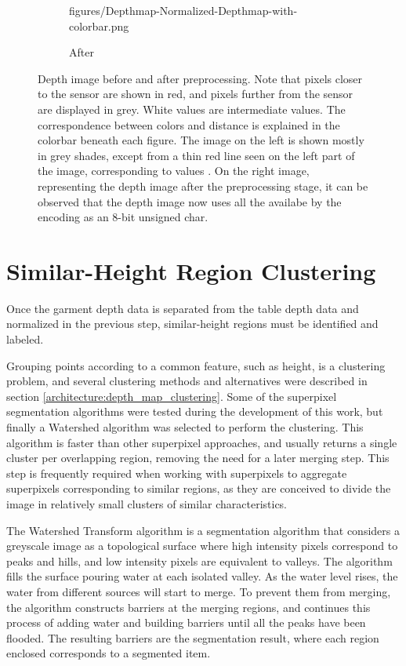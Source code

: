 \begin{figure}[htbp]
\begin{subfigure}[r]{0.485\textwidth}
    	{figures/Depthmap-Normalized-Depthmap-with-colorbar.png}
    	\caption{After}
    	\end{subfigure} 
    \caption[Depth image before and after preprocessing.]
    {Depth image before and after preprocessing. Note that pixels closer to the sensor are shown in red, and pixels further from the sensor are displayed in grey. White values are intermediate values. The correspondence between colors and distance is explained in the colorbar beneath each figure. The image on the left is shown mostly in grey shades, except from a thin red line seen on the left part of the image, corresponding to values . On the right image, representing the depth image after the preprocessing stage, it can be observed that the depth image now uses all the  availabe by the encoding as an 8-bit unsigned char.}
    \label{fig:depth_map_preprocessing}
\end{figure}


\section{Similar-Height Region Clustering}
\label{garment_clustering_watershed}

Once the garment depth data is separated from the table depth data and normalized in the previous step, similar-height regions must be identified and labeled.

Grouping points according to a common feature, such as height, is a clustering problem, and several clustering methods and alternatives were described in section \ref{architecture:depth_map_clustering}. Some of the superpixel segmentation algorithms were tested during the development of this work, but finally a Watershed \cite{digabel1978iterative} algorithm was selected to perform the clustering. This algorithm is faster than other superpixel approaches, and usually returns a single cluster per overlapping region, removing the need for a later merging step. This step is frequently required when working with superpixels to aggregate superpixels corresponding to similar regions, as they are conceived to divide the image in relatively small clusters of similar characteristics.

The Watershed Transform algorithm is a segmentation algorithm that considers a greyscale image as a topological surface where high intensity pixels correspond to peaks and hills, and low intensity pixels are equivalent to valleys. The algorithm fills the surface pouring water at each isolated valley. As the water level rises, the water from different sources will start to merge. To prevent them from merging, the algorithm constructs barriers at the merging regions, and continues this process of adding water and building barriers until all the peaks have been flooded. The resulting barriers are the segmentation result, where each region enclosed corresponds to a segmented item. 

